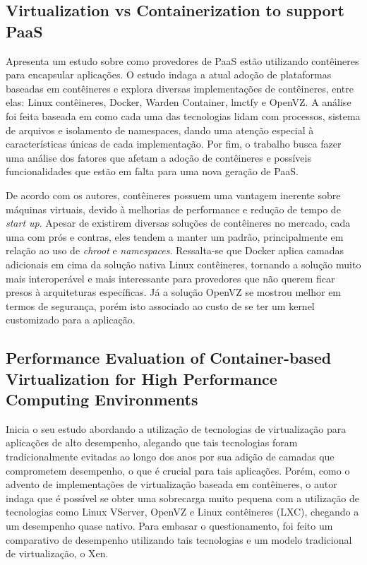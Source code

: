 \documentclass[twoside,english,brazilian]{UNISINOSartigo}
\begin{document}
\begin{itemize}
\subsection{Virtualization vs Containerization to support PaaS}
\label{trabdocker2}
\cite{Dua2014} Apresenta um estudo sobre como provedores de PaaS estão utilizando contêineres para encapsular aplicações. O estudo indaga a atual adoção de plataformas baseadas em contêineres e explora diversas implementações de contêineres, entre elas: Linux contêineres, Docker, Warden Container, lmctfy e OpenVZ. A análise foi feita baseada em como cada uma das tecnologias lidam com processos, sistema de arquivos e isolamento de namespaces, dando uma atenção especial à características únicas de cada implementação. Por fim, o trabalho busca fazer uma análise dos fatores que afetam a adoção de contêineres e possíveis funcionalidades que estão em falta para uma nova geração de PaaS.

De acordo com os autores, contêineres possuem uma vantagem inerente sobre máquinas virtuais, devido à melhorias de performance e redução de tempo de \textit{start up}. Apesar de existirem diversas soluções de contêineres no mercado, cada uma com prós e contras, eles tendem a manter um padrão, principalmente em relação ao uso de \textit{chroot} e \textit{namespaces}. Ressalta-se que Docker aplica camadas adicionais em cima da solução nativa Linux contêineres, tornando a solução muito mais interoperável e mais interessante para provedores que não querem ficar presos à arquiteturas específicas. Já a solução OpenVZ se mostrou melhor em termos de segurança, porém isto associado ao custo de se ter um kernel customizado para a aplicação.

\subsection{Performance Evaluation of Container-based Virtualization for High Performance Computing Environments}
\label{trabdocker3}
\cite{Xavier2013} Inicia o seu estudo abordando a utilização de tecnologias de virtualização para aplicações de alto desempenho, alegando que tais tecnologias foram tradicionalmente evitadas ao longo dos anos por sua adição de camadas que comprometem desempenho, o que é crucial para tais aplicações. Porém, como o advento de implementações de virtualização baseada em contêineres, o autor indaga que é possível se obter uma sobrecarga muito pequena com a utilização de tecnologias como Linux VServer, OpenVZ e Linux contêineres (LXC), chegando a um desempenho quase nativo. Para embasar o questionamento, foi feito um comparativo de desempenho utilizando tais tecnologias e um modelo tradicional de virtualização, o Xen. 


\end{itemize}
\end{document}
